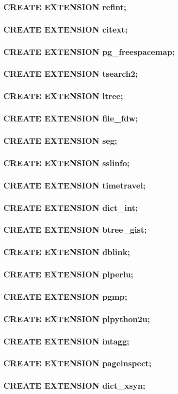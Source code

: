\documentclass[utf8,hyperref={pdftex,colorlinks,linkcolor=black,citecolor=black,urlcolor=black,filecolor=black,plainpages=false},xcolor=table,hyperref]{beamer}
\begin{document}
\begin{frame}
	\frametitle{CREATE EXTENSION refint;}
\end{frame}

\begin{frame}
	\frametitle{CREATE EXTENSION citext;}
\end{frame}

\begin{frame}
	\frametitle{CREATE EXTENSION pg_freespacemap;}
\end{frame}

\begin{frame}
	\frametitle{CREATE EXTENSION tsearch2;}
\end{frame}

\begin{frame}
	\frametitle{CREATE EXTENSION ltree;}
\end{frame}

\begin{frame}
	\frametitle{CREATE EXTENSION file_fdw;}
\end{frame}

\begin{frame}
	\frametitle{CREATE EXTENSION seg;}
\end{frame}

\begin{frame}
	\frametitle{CREATE EXTENSION sslinfo;}
\end{frame}

\begin{frame}
	\frametitle{CREATE EXTENSION timetravel;}
\end{frame}

\begin{frame}
	\frametitle{CREATE EXTENSION dict_int;}
\end{frame}

\begin{frame}
	\frametitle{CREATE EXTENSION btree_gist;}
\end{frame}

\begin{frame}
	\frametitle{CREATE EXTENSION dblink;}
\end{frame}

\begin{frame}
	\frametitle{CREATE EXTENSION plperlu;}
\end{frame}

\begin{frame}
	\frametitle{CREATE EXTENSION pgmp;}
\end{frame}

\begin{frame}
	\frametitle{CREATE EXTENSION plpython2u;}
\end{frame}

\begin{frame}
	\frametitle{CREATE EXTENSION intagg;}
\end{frame}

\begin{frame}
	\frametitle{CREATE EXTENSION pageinspect;}
\end{frame}

\begin{frame}
	\frametitle{CREATE EXTENSION dict_xsyn;}
\end{frame}
\end{document}
